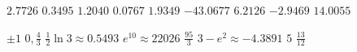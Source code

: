 \begin{Answer}[ref={exLogFunctions}]
\Question %
\begin{tasks}
	\task $2.7726$
	\task $0.3495$ 
	\task $1.2040$ 
	\task $0.0767$
	\task $1.9349$
	\task $ -43.0677$ 
	\task $6.2126$
	\task $ -2.9469$ 
	\task $14.0055$ 
\end{tasks}

\Question %
\begin{tasks}
	\task $ \pm 1$
	\task $0 ,\frac{4}{3}$ 
	\task $\frac{1}{2} \ln  3 \approx 0.5493$
	\task $e^{10} \approx 22026$ 
	\task $\frac{95}{3}$ 
	\task $3 -e^{2} \approx  -4.3891$ 
	\task $5$ 
	\task $\frac{13}{12}$ 
\end{tasks}	
\end{Answer}%

